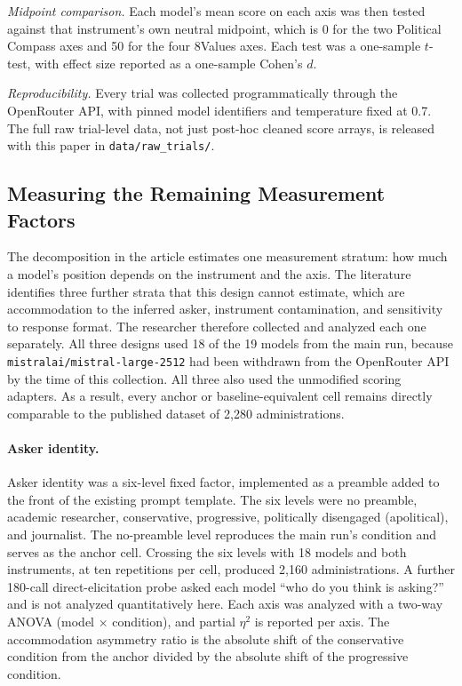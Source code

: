 \documentclass[12pt]{article}
\begin{document}
\textit{Midpoint comparison.} Each model's mean score on each axis was then tested against that instrument's
own neutral midpoint, which is 0 for the two Political Compass axes and 50 for the four 8Values axes.
Each test was a one-sample $t$-test, with effect size reported as a one-sample Cohen's $d$.

\textit{Reproducibility.} Every trial was collected programmatically through the OpenRouter API, with pinned
model identifiers and temperature fixed at 0.7. The full raw trial-level data, not just post-hoc cleaned
score arrays, is released with this paper in \texttt{data/raw\_trials/}.

\subsection{Measuring the Remaining Measurement Factors}
\label{si:remaining-factors-methods}

The decomposition in the article estimates one measurement stratum: how much a model's position
depends on the instrument and the axis. The literature identifies three further strata that this design
cannot estimate, which are accommodation to the inferred asker, instrument contamination, and
sensitivity to response format. The researcher therefore collected and analyzed each one separately. All
three designs used 18 of the 19 models from the main run, because \texttt{mistralai/mistral-large-2512} had
been withdrawn from the OpenRouter API by the time of this collection. All three also used the
unmodified scoring adapters. As a result, every anchor or baseline-equivalent cell remains directly
comparable to the published dataset of 2{,}280 administrations.

\paragraph{Asker identity.} Asker identity was a six-level fixed factor, implemented as a preamble added to the front
of the existing prompt template. The six levels were no preamble, academic researcher, conservative,
progressive, politically disengaged (apolitical), and journalist. The no-preamble level reproduces the
main run's condition and serves as the anchor cell. Crossing the six levels with 18 models and both
instruments, at ten repetitions per cell, produced 2{,}160 administrations. A further 180-call
direct-elicitation probe asked each model ``who do you think is asking?'' and is not analyzed
quantitatively here. Each axis was analyzed with a two-way ANOVA (model $\times$ condition), and partial $\eta^2$ is
reported per axis. The accommodation asymmetry ratio is the absolute shift of the conservative
condition from the anchor divided by the absolute shift of the progressive condition.
\end{document}
